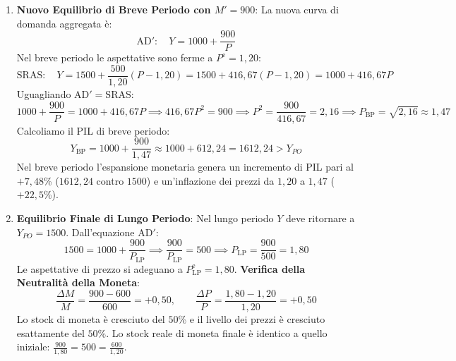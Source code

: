 \begin{esercizio}
\begin{enumerate}
    \item \textbf{Nuovo Equilibrio di Breve Periodo con $M' = 900$}:
    La nuova curva di domanda aggregata è:
    \begin{equation*}
        \mathrm{AD}': \quad Y = 1000 + \frac{900}{P}
    \end{equation*}
    Nel breve periodo le aspettative sono ferme a $P^{\mathrm{e}} = 1{,}20$:
    \begin{equation*}
        \mathrm{SRAS}: \quad Y = 1500 + \frac{500}{1{,}20}(P - 1{,}20) = 1500 + 416{,}67(P - 1{,}20) = 1000 + 416{,}67 P
    \end{equation*}
    Uguagliando $\mathrm{AD}' = \mathrm{SRAS}$:
    \begin{equation*}
        1000 + \frac{900}{P} = 1000 + 416{,}67 P \implies 416{,}67 P^2 = 900 \implies P^2 = \frac{900}{416{,}67} = 2{,}16 \implies P_{\text{BP}} = \sqrt{2{,}16} \approx 1{,}47
    \end{equation*}
    Calcoliamo il PIL di breve periodo:
    \begin{equation*}
        Y_{\text{BP}} = 1000 + \frac{900}{1{,}47} \approx 1000 + 612{,}24 = 1612{,}24 > Y_{PO}
    \end{equation*}
    Nel breve periodo l'espansione monetaria genera un incremento di PIL pari al $+7{,}48$\% ($1612{,}24$ contro $1500$) e un'inflazione dei prezzi da $1{,}20$ a $1{,}47$ ($+22{,}5$\%).

    \item \textbf{Equilibrio Finale di Lungo Periodo}:
    Nel lungo periodo $Y$ deve ritornare a $Y_{PO} = 1500$.
    Dall'equazione $\mathrm{AD}'$:
    \begin{equation*}
        1500 = 1000 + \frac{900}{P_{\text{LP}}} \implies \frac{900}{P_{\text{LP}}} = 500 \implies P_{\text{LP}} = \frac{900}{500} = 1{,}80
    \end{equation*}
    Le aspettative di prezzo si adeguano a $P_{\text{LP}}^{\mathrm{e}} = 1{,}80$.
    \textbf{Verifica della Neutralità della Moneta}:
    \begin{equation*}
        \frac{\Delta M}{M} = \frac{900 - 600}{600} = +0{,}50, \qquad \frac{\Delta P}{P} = \frac{1{,}80 - 1{,}20}{1{,}20} = +0{,}50
    \end{equation*}
    Lo stock di moneta è cresciuto del $50$\% e il livello dei prezzi è cresciuto esattamente del $50$\%. Lo stock reale di moneta finale è identico a quello iniziale: $\frac{900}{1{,}80} = 500 = \frac{600}{1{,}20}$.
\end{enumerate}
\end{esercizio}

